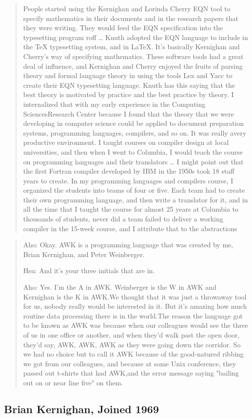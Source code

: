 \begin{quotation}
	People started using the Kernighan and Lorinda Cherry EQN tool to specify mathematics in their
	documents and in the research papers that they were writing. They would feed the EQN specification
	into the typesetting program roff
	\dots
	Knuth adopted the EQN language to include in the TeX typesetting system, and in LaTeX. It's
	basically Kernighan and Cherry's way of specifying mathematics. These software tools had a great
	deal of influence, and Kernighan and Cherry enjoyed the fruits of parsing theory and formal language
	theory in using the tools Lex and Yacc to create their EQN typesetting language. Knuth has this
	saying that the best theory is motivated by practice and the best practice by theory. I internalized
	that with my early experience in the Computing SciencesResearch Center because I found that the
	theory that we were developing in computer science could be applied to document preparation systems,
	programming languages, compilers, and so on. It was really avery productive environment. I taught
	courses on compiler design at local universities, and then when I went to Columbia, I would teach
	the course on programming languages and their translators
	\dots
	I might point out that the first Fortran compiler developed by IBM in the 1950s took 18 staff years
	to create. In my programming languages and compilers course, I organized the students into teams of
	four or five. Each team had to create their own programming language, and then write a translator
	for it, and in all the time that I taught the course for almost 25 years at Columbia to thousands of
	students, never did a team failed to deliver a working compiler in the 15-week course, and I
	attribute that to the abstractions
	\cite{aho_oral_history_2022}
\end{quotation}
\begin{quotation}
	Aho: Okay. AWK is a programming language that was created by me, Brian
	Kernighan, and Peter Weinberger.

	Hsu: And it's your three initials that are in.

	Aho: Yes. I'm the A in AWK. Weinberger is the W in AWK and Kernighan is the
	K in AWK.We thought that it was just a throwaway tool for us, nobody really
	would be interested in it. But it's amazing how much routine data processing
	there is in the world.The reason the language got to be known as AWK was because
	when our colleagues would see the three of us in one office or another, and when
	they'd walk past the open door, they'd say, AWK, AWK, AWK as they were going
	down the corridor. So we had no choice but to call it AWK because of the
	good-natured ribbing we got from our colleagues, and because at some Unix
	conference, they passed out t-shirts that had AWK,and the error message saying
	"bailing out on or near line five" on them.
\end{quotation}



\subsection{Brian Kernighan, Joined 1969}
